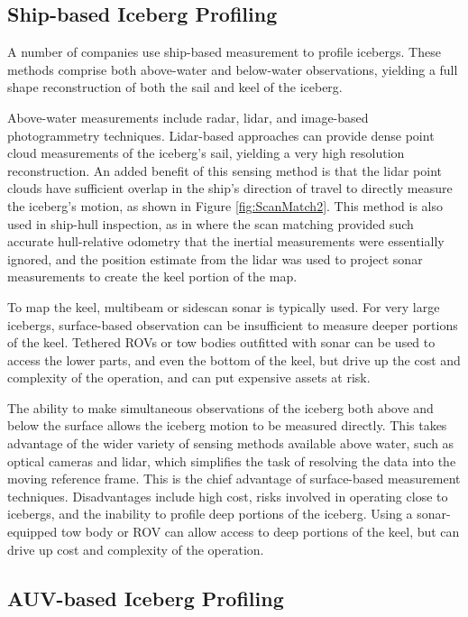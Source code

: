 \subsection{Ship-based Iceberg Profiling}

A number of companies use ship-based measurement to profile icebergs. These methods comprise both above-water and below-water observations, yielding a full shape reconstruction of both the sail and keel of the iceberg. 

Above-water measurements include radar, lidar, and image-based photogrammetry techniques. Lidar-based approaches can provide dense point cloud measurements of the iceberg's sail, yielding a very high resolution reconstruction. An added benefit of this sensing method is that the lidar point clouds have sufficient overlap in the ship's direction of travel to directly measure the iceberg's motion, as shown in Figure \ref{fig:ScanMatch2}. This method is also used in ship-hull inspection, as in \cite{Papadopoulos2014} where the scan matching provided such accurate hull-relative odometry that the inertial measurements were essentially ignored, and the position estimate from the lidar was used to project sonar measurements to create the keel portion of the map.

To map the keel, multibeam or sidescan sonar is typically used. For very large icebergs, surface-based observation can be insufficient to measure deeper portions of the keel. Tethered ROVs or tow bodies outfitted with sonar can be used to access the lower parts, and even the bottom of the keel, but drive up the cost and complexity of the operation, and can put expensive assets at risk. 

The ability to make simultaneous observations of the iceberg both above and below the surface allows the iceberg motion to be measured directly. This takes advantage of the wider variety of sensing methods available above water, such as optical cameras and lidar, which simplifies the task of resolving the data into the moving reference frame. This is the chief advantage of surface-based measurement techniques. Disadvantages include high cost, risks involved in operating close to icebergs, and the inability to profile deep portions of the iceberg. Using a sonar-equipped tow body or ROV can allow access to deep portions of the keel, but can drive up cost and complexity of the operation. 


\subsection{AUV-based Iceberg Profiling}

